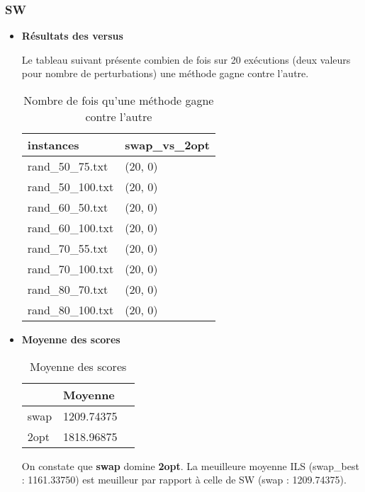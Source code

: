 \subsubsection{SW}
\begin{itemize}
	\item \textbf{Résultats des versus}
	
	Le tableau suivant présente combien de fois sur 20 exécutions (deux valeurs pour nombre de perturbations) une méthode gagne contre l'autre. 
	
	\begin{table}[H]
		\centering
		\caption{Nombre de fois qu'une méthode gagne contre l'autre}
		\begin{tabular}[t]
			{m{0.2\textwidth}m{}}
			\toprule
			instances &	swap\_vs\_2opt  \\
			
			\midrule
			rand\_50\_75.txt& (20, 0)	\\
			rand\_50\_100.txt& (20, 0)	\\
			rand\_60\_50.txt& (20, 0)	\\
			rand\_60\_100.txt& (20, 0)	\\
			rand\_70\_55.txt&	(20, 0)\\
			rand\_70\_100.txt&	(20, 0)\\
			rand\_80\_70.txt&(20, 0)	\\
			rand\_80\_100.txt&	(20, 0)\\
			
			
			\bottomrule
		\end{tabular}
	\end{table}
	\item \textbf{Moyenne des scores}
	
	\begin{table}[ht]
		\rowcolors{2}{gray!10}{white}
		\centering
		\caption{Moyenne des scores}
		\begin{tabular}[t]
			{m{}m{}m{}}
			\toprule
			 &		Moyenne\\
			\midrule
			swap&		1209.74375 \\
			2opt&		1818.96875\\
			
			\bottomrule
		\end{tabular}
	\end{table}
	On constate que \textbf{swap} domine \textbf{2opt}. La meuilleure moyenne ILS (swap\_best : 1161.33750) est meuilleur par rapport à celle de SW (swap : 1209.74375).
	
\end{itemize}

